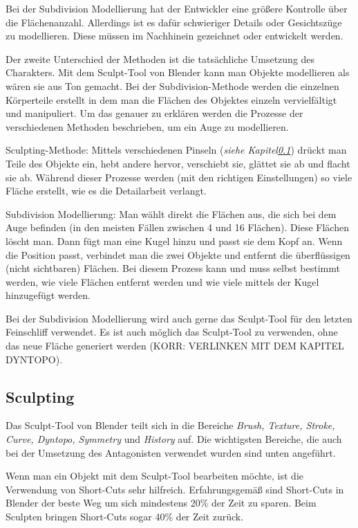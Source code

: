 Bei der Subdivision Modellierung hat der Entwickler eine größere Kontrolle über die Flächenanzahl. Allerdings ist es
dafür schwieriger Details oder Gesichtszüge zu modellieren. Diese müssen im Nachhinein gezeichnet oder entwickelt
werden.

Der zweite Unterschied der Methoden ist die tatsächliche Umsetzung des Charakters. Mit dem Sculpt-Tool von Blender
kann man Objekte modellieren als wären sie aus Ton gemacht. Bei der Subdivision-Methode werden die einzelnen
Körperteile erstellt in dem man die Flächen des Objektes einzeln vervielfältigt und manipuliert. Um das genauer zu
erklären werden die Prozesse der verschiedenen Methoden beschrieben, um ein Auge zu modellieren.

Sculpting-Methode:
Mittels verschiedenen Pinseln (\textit{siehe Kapitel\ref{sec:sculpting}}) drückt man Teile des Objekte ein,
hebt andere hervor, verschiebt sie, glättet sie ab und flacht sie ab. Während dieser Prozesse werden (mit den richtigen
Einstellungen) so viele Fläche erstellt, wie es die Detailarbeit verlangt.

Subdivision Modellierung:
Man wählt direkt die Flächen aus, die sich bei dem Auge befinden (in den meisten Fällen zwischen 4 und 16 Flächen).
Diese Flächen löscht man. Dann fügt man eine Kugel hinzu und passt sie dem Kopf an. Wenn die Position passt,
verbindet man die zwei Objekte und entfernt die überflüssigen (nicht sichtbaren) Flächen. Bei diesem Prozess kann und
muss selbst bestimmt werden, wie viele Flächen entfernt werden und wie viele mittels der Kugel hinzugefügt werden.

Bei der Subdivision Modellierung wird auch gerne das Sculpt-Tool für den letzten Feinschliff verwendet. Es ist auch
möglich das Sculpt-Tool zu verwenden, ohne das neue Fläche generiert werden (KORR: VERLINKEN MIT DEM KAPITEL
DYNTOPO).

\subsection{Sculpting}
\label{sec:sculpting}

Das Sculpt-Tool von Blender teilt sich in die Bereiche \textit{Brush, Texture, Stroke, Curve, Dyntopo, Symmetry}
und \textit{History} auf. Die wichtigsten Bereiche, die auch bei der Umsetzung des Antagonisten verwendet wurden sind
unten angeführt.

Wenn man ein Objekt mit dem Sculpt-Tool bearbeiten möchte, ist die Verwendung von Short-Cuts
sehr hilfreich. Erfahrungsgemäß sind Short-Cuts in Blender  der beste Weg um sich mindestens 20\% der Zeit zu
sparen. Beim Sculpten bringen Short-Cuts sogar 40\% der Zeit zurück.


